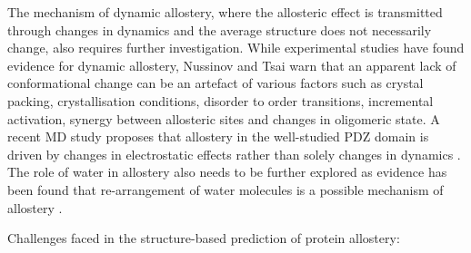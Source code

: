 The mechanism of dynamic allostery, where the allosteric effect is transmitted through changes in dynamics and the average structure does not necessarily change, also requires further investigation.
While experimental studies \cite{Popovych2006, Capdevila2017, Wellington2017} have found evidence for dynamic allostery, Nussinov and Tsai \cite{Nussinov2015} warn that an apparent lack of conformational change can be an artefact of various factors such as crystal packing, crystallisation conditions, disorder to order transitions, incremental activation, synergy between allosteric sites and changes in oligomeric state.
A recent MD study proposes that allostery in the well-studied PDZ domain is driven by changes in electrostatic effects rather than solely changes in dynamics \cite{Kumawat2017, Liu2017}.
The role of water in allostery also needs to be further explored as evidence has been found that re-arrangement of water molecules is a possible mechanism of allostery \cite{Buchli2013, Amor2016}.


Challenges faced in the structure-based prediction of protein allostery:

